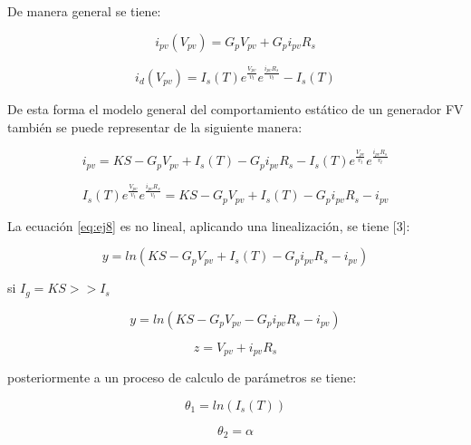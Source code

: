 De manera general se tiene: 

\begin{equation} \label{eq:ej5}
  i_{pv} \left(V_{pv}\right) 
  =
  G_{p}V_{pv} + G_{p}i_{pv}R_s
\end{equation}


\begin{equation} \label{eq:ej6}
  i_{d} \left(V_{pv}\right) 
  =
  I_s \left(T \right) e^\frac{V_{pv}}{v_t} e^\frac{ i_{pv}R_{s}}{v_t} -I_s \left(T \right)
\end{equation}

De esta forma el modelo general del comportamiento estático de un generador FV también se puede representar de la siguiente manera: 

\begin{equation} \label{eq:ej7}
  i_{pv}  
  =
  KS - G_{p}V_{pv} + I_s \left(T \right) - G_{p}i_{pv}R_s - I_s \left(T \right) e^\frac{V_{pv}}{v_t} e^\frac{ i_{pv}R_{s}}{v_t} 
\end{equation}

\begin{equation} \label{eq:ej8}
  I_s \left(T \right) e^\frac{V_{pv}}{v_t} e^\frac{ i_{pv}R_{s}}{v_t}   
  =
  KS - G_{p}V_{pv} + I_s \left(T \right) - G_{p}i_{pv}R_s - i_{pv} 
\end{equation}

La ecuación \ref{eq:ej8} es no lineal, aplicando una linealización, se tiene [3]: 

\begin{equation} \label{eq:ej9}
  y = ln \left(KS - G_{p}V_{pv} + I_s \left(T \right) - G_{p}i_{pv}R_s - i_{pv} \right) 
\end{equation}

si $ I_g = KS >> I_s $

\begin{equation} \label{eq:ej10}
  y = ln \left(KS - G_{p}V_{pv} - G_{p}i_{pv}R_s - i_{pv} \right) 
\end{equation}

\begin{equation} \label{eq:ej11}
  z = V_{pv} + i_{pv}R_s  
\end{equation}

posteriormente a un proceso de calculo de parámetros se tiene: 

\begin{equation} \label{eq:ej12}
  \theta_1  = ln\left( I_s \left(T \right) \right)
\end{equation}

\begin{equation} \label{eq:ej13}
  \theta_2  = \alpha 
\end{equation}

